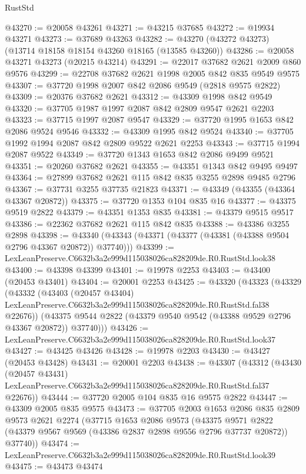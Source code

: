 \begin{lexlean}{RustStd}
\begin{coremodule}
@43270 := @20058 @43261
@43271 := @43215 @37685
@43272 := @19934 @43271
@43273 := @37689 @43263
@43282 := @43270 (@43272 @43273) (@13714 @18158 @18154 @43260 @18165 (@13585 @43260))
@43286 := @20058 @43271 @43273 (@20215 @43214)
@43291 := @22017 @37682 @2621 @2009 @860 @9576
@43299 := @22708 @37682 @2621 @1998 @2005 @842 @835 @9549 @9575
@43307 := @37720 @1998 @2007 @842 @2086 @9549 (@2818 @9575 @2822)
@43309 := @20376 @37682 @2621
@43312 := @43309 @1998 @842 @9549
@43320 := @37705 @1987 @1997 @2087 @842 @2809 @9547 @2621 @2203
@43323 := @37715 @1997 @2087 @9547
@43329 := @37720 @1995 @1653 @842 @2086 @9524 @9546
@43332 := @43309 @1995 @842 @9524
@43340 := @37705 @1992 @1994 @2087 @842 @2809 @9522 @2621 @2253
@43343 := @37715 @1994 @2087 @9522
@43349 := @37720 @1343 @1653 @842 @2086 @9499 @9521
@43351 := @20260 @37682 @2621
@43355 := @43351 @1343 @842 @9495 @9497
@43364 := @27899 @37682 @2621 @115 @842 @835 @3255 @2898 @9485 @2796
@43367 := @37731 @3255 @37735 @21823
@43371 := @43349 (@43355 (@43364 @43367 @20872))
@43375 := @37720 @1353 @104 @835 @16
@43377 := @43375 @9519 @2822
@43379 := @43351 @1353 @835
@43381 := @43379 @9515 @9517
@43386 := @22362 @37682 @2621 @115 @842 @835
@43388 := @43386 @3255 @2898
@43398 := @43340 (@43343 (@43371 (@43377 (@43381 (@43388 @9504 @2796 @43367 @20872)) @37740)))
@43399 := LexLeanPreserve.C6632b3a2e999d115038026ca828209de.R0.RustStd.look38
@43400 := @43398 @43399
@43401 := @19978 @2253
@43403 := @43400 (@20453 @43401)
@43404 := @20001 @2253
@43425 := @43320
    (@43323
      (@43329
        (@43332
          (@43403
            (@20457 @43404)
            LexLeanPreserve.C6632b3a2e999d115038026ca828209de.R0.RustStd.fal38
            @22676))
        (@43375 @9544 @2822 (@43379 @9540 @9542 (@43388 @9529 @2796 @43367 @20872)) @37740)))
@43426 := LexLeanPreserve.C6632b3a2e999d115038026ca828209de.R0.RustStd.look37
@43427 := @43425 @43426
@43428 := @19978 @2203
@43430 := @43427 (@20453 @43428)
@43431 := @20001 @2203
@43438 := @43307
    (@43312
      (@43430
        (@20457 @43431)
        LexLeanPreserve.C6632b3a2e999d115038026ca828209de.R0.RustStd.fal37
        @22676))
@43444 := @37720 @2005 @104 @835 @16 @9575 @2822
@43447 := @43309 @2005 @835 @9575
@43473 := @37705
    @2003
    @1653
    @2086
    @835
    @2809
    @9573
    @2621
    @2274
    (@37715
      @1653
      @2086
      @9573
      (@43375
        @9571
        @2822
        (@43379 @9567 @9569 (@43386 @2837 @2898 @9556 @2796 @37737 @20872))
        @37740))
@43474 := LexLeanPreserve.C6632b3a2e999d115038026ca828209de.R0.RustStd.look39
@43475 := @43473 @43474

\end{coremodule}
\end{lexlean}
